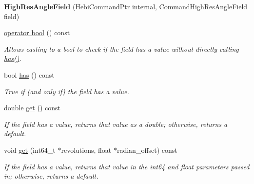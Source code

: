 \begin{DoxyCompactItemize}
\item 
\mbox{\label{classhebi_1_1Command_1_1HighResAngleField_aaf8bed01fb55cacfc0d2e9965469c8f0}} 
{\bfseries High\+Res\+Angle\+Field} (Hebi\+Command\+Ptr internal, Command\+High\+Res\+Angle\+Field field)
\item 
\hyperlink{classhebi_1_1Command_1_1HighResAngleField_a8af360ea241e9c61b77d029242489269}{operator bool} () const
\begin{DoxyCompactList}\small\item\em Allows casting to a bool to check if the field has a value without directly calling {\ttfamily \hyperlink{classhebi_1_1Command_1_1HighResAngleField_ae52c768ae24a84a181963dafa8f21d3b}{has()}}. \end{DoxyCompactList}\item 
\mbox{\label{classhebi_1_1Command_1_1HighResAngleField_ae52c768ae24a84a181963dafa8f21d3b}} 
bool \hyperlink{classhebi_1_1Command_1_1HighResAngleField_ae52c768ae24a84a181963dafa8f21d3b}{has} () const
\begin{DoxyCompactList}\small\item\em True if (and only if) the field has a value. \end{DoxyCompactList}\item 
double \hyperlink{classhebi_1_1Command_1_1HighResAngleField_ae05cea46d5ec4bbc632aea9b3a5c7598}{get} () const
\begin{DoxyCompactList}\small\item\em If the field has a value, returns that value as a double; otherwise, returns a default. \end{DoxyCompactList}\item 
void \hyperlink{classhebi_1_1Command_1_1HighResAngleField_a4d2e6a23fce48eee2aa28803077cd1f0}{get} (int64\+\_\+t $\ast$revolutions, float $\ast$radian\+\_\+offset) const
\begin{DoxyCompactList}\small\item\em If the field has a value, returns that value in the int64 and float parameters passed in; otherwise, returns a default. \end{DoxyCompactList}\item 
\mbox{\label{classhebi_1_1Command_1_1HighResAngleField_aa166a76f8a6ea47b62dd53bee853fe90}} 

\end{DoxyCompactItemize}
